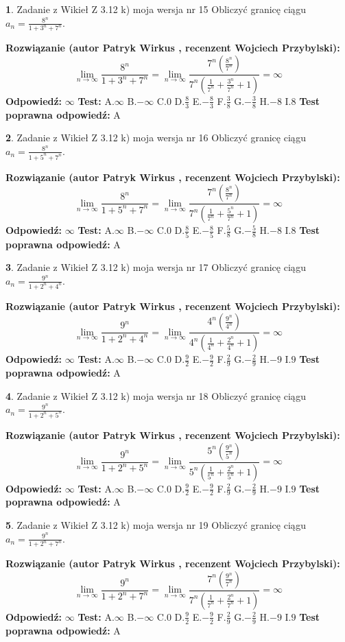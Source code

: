 \documentclass[12pt, a4paper]{article}
\theoremstyle{definition} %
\newtheorem{zad}{}
\newcommand{\zadStart}[1]{\begin{zad}#1\newline}
\newcommand{\zadStop}{\end{zad}}
\newcommand{\rozwStart}[2]{\noindent \textbf{Rozwiązanie (autor #1 , recenzent #2): }\newline}
\newcommand{\rozwStop}{\newline}
\newcommand{\odpStart}{\noindent \textbf{Odpowiedź:}\newline}
\newcommand{\odpStop}{\newline}
\newcommand{\testStart}{\noindent \textbf{Test:}\newline}
\newcommand{\testStop}{\newline}
\newcommand{\kluczStart}{\noindent \textbf{Test poprawna odpowiedź:}\newline}
\newcommand{\kluczStop}{\newline}
\begin{document}
\zadStart{Zadanie z Wikieł Z 3.12 k) moja wersja nr 15}
Obliczyć granicę ciągu $a_{n}=\frac{8^{n}}{1+3^{n} + 7^{n}}$.
\zadStop
\rozwStart{Patryk Wirkus}{Wojciech Przybylski}
$$\lim\limits_{n\to\infty}\frac{8^{n}}{1+3^{n} + 7^{n}}=
\lim\limits_{n\to\infty}\frac{7^{n}(\frac{8^{n}}{7^{n}} )}{7^{n}(\frac{1}{7^{n}}+\frac{3^{n}}{7^{n}}+1)} = \infty$$
\rozwStop
\odpStart
$\infty$
\odpStop
\testStart
A.$\infty$
B.$-\infty$
C.$0$
D.$\frac{8}{3}$
E.$-\frac{8}{3}$
F.$\frac{3}{8}$
G.$-\frac{3}{8}$
H.$-8$
I.$8$
\testStop
\kluczStart
A
\kluczStop



\zadStart{Zadanie z Wikieł Z 3.12 k) moja wersja nr 16}
Obliczyć granicę ciągu $a_{n}=\frac{8^{n}}{1+5^{n} + 7^{n}}$.
\zadStop
\rozwStart{Patryk Wirkus}{Wojciech Przybylski}
$$\lim\limits_{n\to\infty}\frac{8^{n}}{1+5^{n} + 7^{n}}=
\lim\limits_{n\to\infty}\frac{7^{n}(\frac{8^{n}}{7^{n}} )}{7^{n}(\frac{1}{7^{n}}+\frac{5^{n}}{7^{n}}+1)} = \infty$$
\rozwStop
\odpStart
$\infty$
\odpStop
\testStart
A.$\infty$
B.$-\infty$
C.$0$
D.$\frac{8}{5}$
E.$-\frac{8}{5}$
F.$\frac{5}{8}$
G.$-\frac{5}{8}$
H.$-8$
I.$8$
\testStop
\kluczStart
A
\kluczStop



\zadStart{Zadanie z Wikieł Z 3.12 k) moja wersja nr 17}
Obliczyć granicę ciągu $a_{n}=\frac{9^{n}}{1+2^{n} + 4^{n}}$.
\zadStop
\rozwStart{Patryk Wirkus}{Wojciech Przybylski}
$$\lim\limits_{n\to\infty}\frac{9^{n}}{1+2^{n} + 4^{n}}=
\lim\limits_{n\to\infty}\frac{4^{n}(\frac{9^{n}}{4^{n}} )}{4^{n}(\frac{1}{4^{n}}+\frac{2^{n}}{4^{n}}+1)} = \infty$$
\rozwStop
\odpStart
$\infty$
\odpStop
\testStart
A.$\infty$
B.$-\infty$
C.$0$
D.$\frac{9}{2}$
E.$-\frac{9}{2}$
F.$\frac{2}{9}$
G.$-\frac{2}{9}$
H.$-9$
I.$9$
\testStop
\kluczStart
A
\kluczStop



\zadStart{Zadanie z Wikieł Z 3.12 k) moja wersja nr 18}
Obliczyć granicę ciągu $a_{n}=\frac{9^{n}}{1+2^{n} + 5^{n}}$.
\zadStop
\rozwStart{Patryk Wirkus}{Wojciech Przybylski}
$$\lim\limits_{n\to\infty}\frac{9^{n}}{1+2^{n} + 5^{n}}=
\lim\limits_{n\to\infty}\frac{5^{n}(\frac{9^{n}}{5^{n}} )}{5^{n}(\frac{1}{5^{n}}+\frac{2^{n}}{5^{n}}+1)} = \infty$$
\rozwStop
\odpStart
$\infty$
\odpStop
\testStart
A.$\infty$
B.$-\infty$
C.$0$
D.$\frac{9}{2}$
E.$-\frac{9}{2}$
F.$\frac{2}{9}$
G.$-\frac{2}{9}$
H.$-9$
I.$9$
\testStop
\kluczStart
A
\kluczStop



\zadStart{Zadanie z Wikieł Z 3.12 k) moja wersja nr 19}
Obliczyć granicę ciągu $a_{n}=\frac{9^{n}}{1+2^{n} + 7^{n}}$.
\zadStop
\rozwStart{Patryk Wirkus}{Wojciech Przybylski}
$$\lim\limits_{n\to\infty}\frac{9^{n}}{1+2^{n} + 7^{n}}=
\lim\limits_{n\to\infty}\frac{7^{n}(\frac{9^{n}}{7^{n}} )}{7^{n}(\frac{1}{7^{n}}+\frac{2^{n}}{7^{n}}+1)} = \infty$$
\rozwStop
\odpStart
$\infty$
\odpStop
\testStart
A.$\infty$
B.$-\infty$
C.$0$
D.$\frac{9}{2}$
E.$-\frac{9}{2}$
F.$\frac{2}{9}$
G.$-\frac{2}{9}$
H.$-9$
I.$9$
\testStop
\kluczStart
A
\kluczStop
\end{document}
